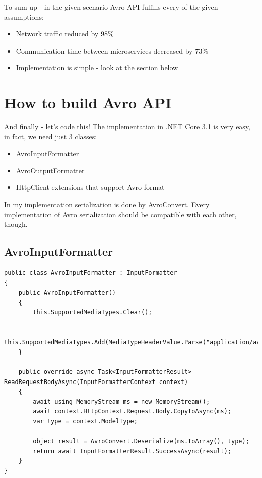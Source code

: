 \documentclass[]{article}
\begin{document}
To sum up - in the given scenario Avro API fulfills every of the given assumptions:
\begin{itemize}
	\item Network traffic reduced by 98\%
	\item Communication time between microservices decreased by 73\%
	\item Implementation is simple - look at the section below
\end{itemize}


\section{How to build Avro API}

And finally - let's code this! The implementation in .NET Core 3.1 is very easy, in fact, we need just 3 classes: 

\begin{itemize}
	\item AvroInputFormatter
	\item AvroOutputFormatter
	\item HttpClient extensions that support Avro format
\end{itemize}

In my implementation serialization is done by AvroConvert. Every implementation of Avro serialization should be compatible with each other, though.

\subsection{AvroInputFormatter}

\begin{lstlisting}[language={[Sharp]C}, label={Script}]
public class AvroInputFormatter : InputFormatter
{
    public AvroInputFormatter()
    {
        this.SupportedMediaTypes.Clear();

        this.SupportedMediaTypes.Add(MediaTypeHeaderValue.Parse("application/avro"));
    }

    public override async Task<InputFormatterResult> ReadRequestBodyAsync(InputFormatterContext context)
    {
        await using MemoryStream ms = new MemoryStream();
        await context.HttpContext.Request.Body.CopyToAsync(ms);
        var type = context.ModelType;

        object result = AvroConvert.Deserialize(ms.ToArray(), type);
        return await InputFormatterResult.SuccessAsync(result);
    }
}
\end{lstlisting}
\end{document}
